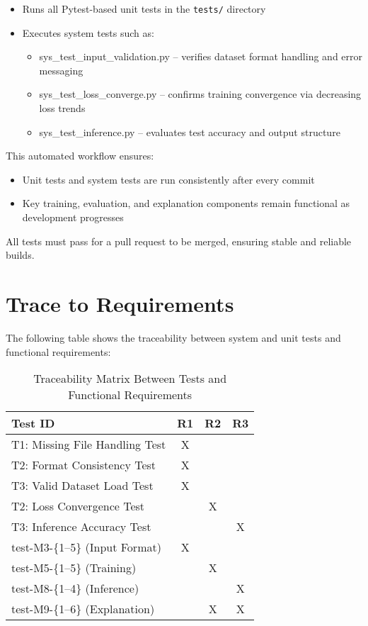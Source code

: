 \documentclass[12pt, titlepage]{article}
\begin{document}
\begin{itemize}
\item Runs all Pytest-based unit tests in the \texttt{tests/} directory
\item Executes system tests such as: 
\begin{itemize} 
    \item sys\_test\_input\_validation.py – verifies dataset format handling and error messaging 
    \item sys\_test\_loss\_converge.py – confirms training convergence via decreasing loss trends 
    \item sys\_test\_inference.py – evaluates test accuracy and output structure \end{itemize} 
\end{itemize}

This automated workflow ensures: \begin{itemize} \item Unit tests and system tests are run consistently after every commit \item Key training, evaluation, and explanation components remain functional as development progresses \end{itemize}

All tests must pass for a pull request to be merged, ensuring stable and reliable builds.

\section{Trace to Requirements}
The following table shows the traceability between system and unit tests and functional requirements:

\begin{table}[h!]
\centering
\begin{tabular}{|l|c|c|c|}
\hline
\textbf{Test ID} & \textbf{R1} & \textbf{R2} & \textbf{R3} \\
\hline
T1: Missing File Handling Test & X &  &  \\ \hline
T2: Format Consistency Test    & X &  &  \\ \hline
T3: Valid Dataset Load Test    & X &  &  \\ \hline
T2: Loss Convergence Test      &  & X &  \\ \hline
T3: Inference Accuracy Test    &  &  & X \\ \hline
test-M3-\{1–5\} (Input Format) & X &  &  \\ \hline
test-M5-\{1–5\} (Training)     &  & X &  \\ \hline
test-M8-\{1–4\} (Inference)    &  &  & X \\ \hline
test-M9-\{1–6\} (Explanation)  &  & X & X \\
\hline
\end{tabular}
\caption{Traceability Matrix Between Tests and Functional Requirements}
\label{Table:req_trace}
\end{table}
\end{document}
